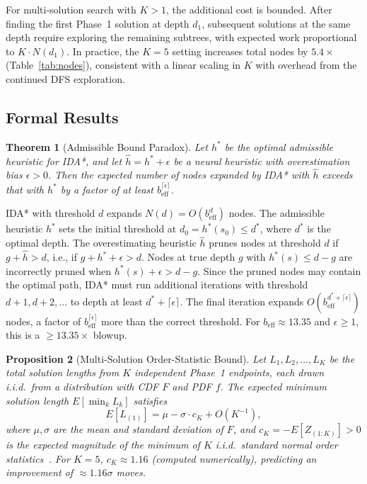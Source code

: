 \documentclass[conference]{IEEEtran}
\newtheorem{theorem}{Theorem}
\newtheorem{proposition}[theorem]{Proposition}
\begin{document}
For multi-solution search with $K > 1$, the additional cost is bounded. After finding the first Phase~1 solution at depth $d_1$, subsequent solutions at the same depth require exploring the remaining subtrees, with expected work proportional to $K \cdot N(d_1)$. In practice, the $K=5$ setting increases total nodes by $5.4\times$ (Table~\ref{tab:nodes}), consistent with a linear scaling in $K$ with overhead from the continued DFS exploration.

\subsection{Formal Results}
\label{sec:formal}

\begin{theorem}[Admissible Bound Paradox]
\label{thm:bound-paradox}
Let $h^*$ be the optimal admissible heuristic for IDA*, and let $\hat{h} = h^* + \epsilon$ be a neural heuristic with overestimation bias $\epsilon > 0$. Then the expected number of nodes expanded by IDA* with $\hat{h}$ exceeds that with $h^*$ by a factor of at least $b_{\mathrm{eff}}^{\lceil\epsilon\rceil}$.
\end{theorem}
\begin{IEEEproof}
IDA* with threshold $d$ expands $N(d) = O(b_{\mathrm{eff}}^d)$ nodes. The admissible heuristic $h^*$ sets the initial threshold at $d_0 = h^*(s_0) \leq d^*$, where $d^*$ is the optimal depth. The overestimating heuristic $\hat{h}$ prunes nodes at threshold $d$ if $g + \hat{h} > d$, i.e., if $g + h^* + \epsilon > d$. Nodes at true depth $g$ with $h^*(s) \leq d - g$ are incorrectly pruned when $h^*(s) + \epsilon > d - g$. Since the pruned nodes may contain the optimal path, IDA* must run additional iterations with threshold $d + 1, d + 2, \ldots$ to depth at least $d^* + \lceil\epsilon\rceil$. The final iteration expands $O(b_{\mathrm{eff}}^{d^*+\lceil\epsilon\rceil})$ nodes, a factor of $b_{\mathrm{eff}}^{\lceil\epsilon\rceil}$ more than the correct threshold. For $b_{\mathrm{eff}} \approx 13.35$ and $\epsilon \geq 1$, this is a $\geq 13.35\times$ blowup.
\end{IEEEproof}

\begin{proposition}[Multi-Solution Order-Statistic Bound]
\label{prop:order-stat}
Let $L_1, L_2, \ldots, L_K$ be the total solution lengths from $K$ independent Phase~1 endpoints, each drawn i.i.d.\ from a distribution with CDF $F$ and PDF $f$. The expected minimum solution length $E[\min_k L_k]$ satisfies
\begin{equation}
E[L_{(1)}] = \mu - \sigma \cdot c_K + O(K^{-1}),
\end{equation}
where $\mu,\sigma$ are the mean and standard deviation of $F$, and $c_K = -E[Z_{(1:K)}] > 0$ is the expected magnitude of the minimum of $K$ i.i.d.\ standard normal order statistics~\cite{david2003}. For $K = 5$, $c_K \approx 1.16$ (computed numerically), predicting an improvement of $\approx 1.16\sigma$ moves.
\end{proposition}
\end{document}
